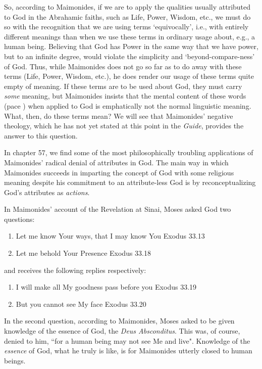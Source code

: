 \documentclass[12pt]{article}
\begin{document}
So, according to Maimonides, if we are to apply the qualities usually attributed to God in the Abrahamic faiths, such as Life, Power, Wisdom, etc., we must do so with the recognition that we are using terms `equivocally', i.e., with entirely different meanings than when we use these terms in ordinary usage about, e.g., a human being. Believing that God has Power in the same way that we have power, but to an infinite degree, would violate the simplicity and `beyond-compare-ness' of God. Thus, while Maimonides does not go so far as to do away with these terms (Life, Power, Wisdom, etc.), he does render our usage of these terms quite empty of meaning. If these terms are to be used about God, they must carry \emph{some} meaning, but Maimonides insists that the mental content of these words (pace \citeauthor{key2018language}) when applied to God is emphatically not the normal linguistic meaning. What, then, do these terms mean? We will see that Maimonides' negative theology, which he has not yet stated at this point in the \emph{Guide}, provides the answer to this question.


In chapter 57, we find some of the most philosophically troubling applications of Maimonides' radical denial of attributes in God. The main way in which Maimonides succeeds in imparting the concept of God with some religious meaning despite his commitment to an attribute-less God is by reconceptualizing God's attributes as \emph{actions}. 

In Maimonides' account of the Revelation at Sinai, Moses asked God two questions:
\begin{enumerate}[itemsep=0mm]
\item Let me know Your ways, that I may know You \hfill Exodus 33.13
\item Let me behold Your Presence \hfill Exodus 33.18
\end{enumerate}
and receives the following replies respectively:
\begin{enumerate}[itemsep=0mm]
\item I will make all My goodness pass before you \hfill Exodus 33.19
\item But you cannot see My face \hfill Exodus 33.20
\end{enumerate}
In the second question, according to Maimonides, Moses asked to be given knowledge of the essence of God, the \emph{Deus Absconditus}. This was, of course, denied to him, ``for a human being may not see Me and live". Knowledge of the \emph{essence} of God, what he truly is like, is for Maimonides utterly closed to human beings.
\end{document}
